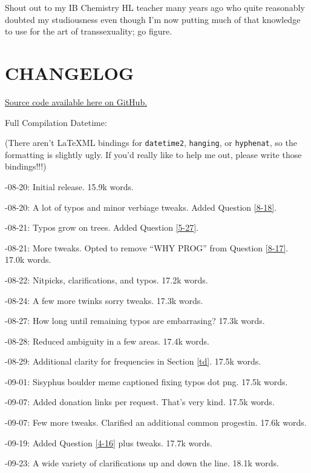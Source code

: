 \documentclass{article}
\begin{document}
Shout out to my IB Chemistry HL teacher many years ago who quite reasonably doubted my studiousness even though I’m now putting much of that knowledge to use for the art of transsexuality; go figure.



\section*{CHANGELOG}

\noindent \href{https://github.com/Juicysteak117/pghrt/}{Source code available here on GitHub.}

\noindent Full Compilation Datetime: \DTMnow

\noindent(There aren't LaTeXML bindings for \texttt{datetime2}, \texttt{hanging}, or \texttt{hyphenat}, so the formatting is slightly ugly. If you'd really like to help me out, please write those bindings!!!)

-08-20: Initial release. 15.9k words.

-08-20: A lot of typos and minor verbiage tweaks. Added Question \ref{8-18}.

-08-21: Typos grow on trees. Added Question \ref{5-27}.

-08-21: More tweaks. Opted to remove “WHY PROG” from Question \ref{8-17}. 17.0k words.

-08-22: Nitpicks, clarifications, and typos. 17.2k words.

-08-24: A few more twinks sorry tweaks. 17.3k words.

-08-27: How long until remaining typos are embarrasing? 17.3k words.

-08-28: Reduced ambiguity in a few areas. 17.4k words.

-08-29: Additional clarity for frequencies in Section \ref{td}. 17.5k words.

-09-01: Sisyphus boulder meme captioned fixing typos dot png. 17.5k words.

-09-07: Added donation links per request. That's very kind. 17.5k words.

-09-07: Few more tweaks. Clarified an additional common progestin. 17.6k words.

-09-19: Added Question \ref{4-16} plus tweaks. 17.7k words.

-09-23: A wide variety of clarifications up and down the line. 18.1k words.
\end{document}
